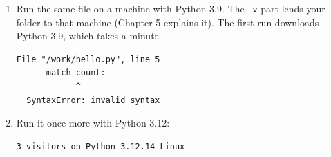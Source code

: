 \begin{enumerate}
\begin{codeblock}
  \end{codeblock}

  \begin{codeblock}
  \begin{Verbatim}[formatcom=\outputstyle]
  3 visitors on Python 3.14.4 Darwin
  \end{Verbatim}
  \end{codeblock}

  Your version may differ; \texttt{Darwin} means macOS.
\item
  Run the same file on a machine with Python 3.9. The \texttt{-v} part lends your folder to that machine (Chapter 5 explains it). The first run downloads Python 3.9, which takes a minute.

  \begin{codeblock}

\begin{Shaded}
\begin{Highlighting}[]
  
\end{Highlighting}
\end{Shaded}

  \end{codeblock}

  \begin{codeblock}
  \begin{Verbatim}[formatcom=\outputstyle]
    File "/work/hello.py", line 5
      match count:
            ^
  SyntaxError: invalid syntax
  \end{Verbatim}
  \end{codeblock}
\item
  Run it once more with Python 3.12:

  \begin{codeblock}

\begin{Shaded}
\begin{Highlighting}[]
  
\end{Highlighting}
\end{Shaded}

  \end{codeblock}

  \begin{codeblock}
  \begin{Verbatim}[formatcom=\outputstyle]
  3 visitors on Python 3.12.14 Linux
  \end{Verbatim}
  \end{codeblock}
\end{enumerate}

